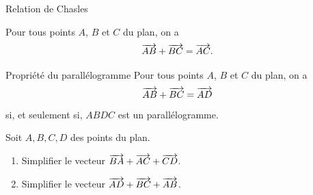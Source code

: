 \documentclass[11pt]{article}
\begin{document}
\begin{propnom}{Relation de Chasles}~\\[-8mm]
  \begin{minipage}[]{.5\textwidth}
    Pour tous points $A$, $B$ et $C$ du plan, on a
  \[
    \overrightarrow{AB}+\overrightarrow{BC} = \overrightarrow{AC}.
  \]
  \end{minipage}
  \begin{minipage}[]{.5\textwidth}
  \begin{center}
  \end{center}
  \end{minipage}
\end{propnom}

\begin{propnom}{Propriété du parallélogramme}
    Pour tous points $A$, $B$ et $C$ du plan, on a
  \[
    \overrightarrow{AB}+\overrightarrow{BC} = \overrightarrow{AD}
  \]
  si, et seulement si, $ABDC$ est un parallélogramme.
\end{propnom}

\begin{app}
  Soit $A, B, C, D$ des points du plan.
  \begin{enumerate}
    \item Simplifier le vecteur $\overrightarrow{BA}+\overrightarrow{AC}+\overrightarrow{CD}$.
    \item Simplifier le vecteur $\overrightarrow{AD}+\overrightarrow{BC}+\overrightarrow{AB}$.
  \end{enumerate}
\end{app}
\end{document}
